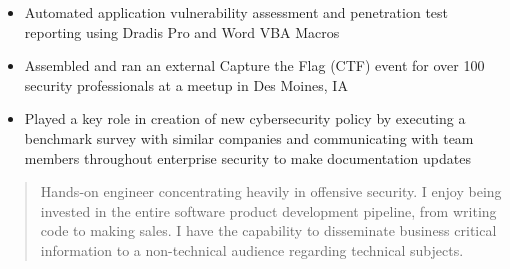 \documentclass[10pt,usletter,ragged2e,withhyper]{altacv}
\begin{document}
\begin{paracol}{2}
\divider

\begin{itemize}
\item Automated application vulnerability assessment and penetration test reporting using Dradis Pro and Word VBA Macros
\item Assembled and ran an external Capture the Flag (CTF) event for over 100 security professionals at a meetup in Des Moines, IA
\end{itemize}

\divider

\begin{itemize}
\item Played a key role in creation of new cybersecurity policy by executing a benchmark survey with similar companies and communicating with team members throughout enterprise security to make documentation updates
\end{itemize}


\hspace*{-1em}  %

\switchcolumn

\begin{quote}
Hands-on engineer concentrating heavily in offensive security. I enjoy being invested in the entire software product development pipeline, from writing code to making sales. I have the capability to disseminate business critical information to a non-technical audience regarding technical subjects. 
\end{quote}



\end{paracol}
\end{document}
